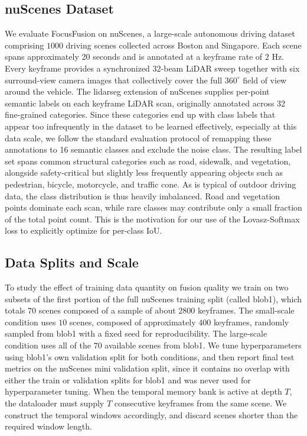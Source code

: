 \documentclass[10pt,twocolumn,letterpaper]{article}
\begin{document}
\subsection{nuScenes Dataset}
We evaluate FocusFusion on nuScenes, a large-scale autonomous driving dataset comprising $1000$ driving scenes collected across Boston and Singapore. Each scene spans approximately 20 seconds and is annotated at a keyframe rate of $2$ Hz. Every keyframe provides a synchronized 32-beam LiDAR sweep together with six surround-view camera images that collectively cover the full $360 ^\circ$ field of view around the vehicle. The lidarseg extension of nuScenes supplies per-point semantic labels on each keyframe LiDAR scan, originally annotated across 32 fine-grained categories. Since these categories end up with class labels that appear too infrequently in the dataset to be learned effectively, especially at this data scale, we follow the standard evaluation protocol of remapping these annotations to 16 semantic classes and exclude the noise class. The resulting label set spans common structural categories such as road, sidewalk, and vegetation, alongside safety-critical but slightly less frequently appearing objects such as pedestrian, bicycle, motorcycle, and traffic cone. As is typical of outdoor driving data, the class distribution is thus heavily imbalanced. Road and vegetation points dominate each scan, while rare classes may contribute only a small fraction of the total point count. This is the motivation for our use of the Lovasz-Softmax loss to explicitly optimize for per-class IoU. 

\subsection{Data Splits and Scale}

To study the effect of training data quantity on fusion quality we train on two subsets of the first portion of the full nuScenes training split (called blob1), which totals $70$ scenes composed of a sample of about $2800$ keyframes. The small-scale condition uses $10$ scenes, composed of approximately $400$ keyframes, randomly sampled from blob1 with a fixed seed for reproducibility. The large-scale condition uses all of the $70$ available scenes from blob1. We tune hyperparameters using blob1's own validation split for both conditions, and then report final test metrics on the nuScenes mini validation split, since it contains no overlap with either the train or validation splits for blob1 and was never used for hyperparameter tuning. When the temporal memory bank is active at depth $T$, the dataloader must supply $T$ consecutive keyframes from the same scene. We construct the temporal windows accordingly, and discard scenes shorter than the required window length.
\end{document}
